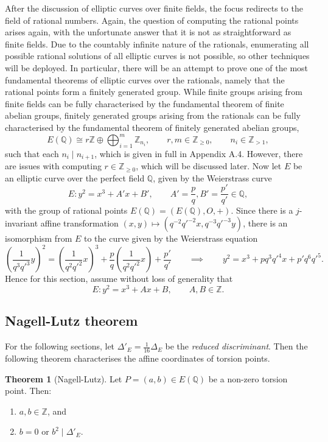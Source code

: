 \documentclass{article}
\newcommand{\Z}{\mathbb{Z}}
\newcommand{\Q}{\mathbb{Q}}
\newcommand{\rb}[1]{\left( #1 \right)}
\theoremstyle{definition}\newtheorem*{definition}{Definition}
\theoremstyle{definition}\newtheorem*{example}{Example}
\theoremstyle{definition}\newtheorem*{remark}{Remark}
\newtheorem{theorem}[proposition]{Theorem}
\begin{document}
After the discussion of elliptic curves over finite fields, the focus redirects to the field of rational numbers. Again, the question of computing the rational points arises again, with the unfortunate answer that it is not as straightforward as finite fields. Due to the countably infinite nature of the rationals, enumerating all possible rational solutions of all elliptic curves is not possible, so other techniques will be deployed. In particular, there will be an attempt to prove one of the most fundamental theorems of elliptic curves over the rationals, namely that the rational points form a finitely generated group. While finite groups arising from finite fields can be fully characterised by the fundamental theorem of finite abelian groups, finitely generated groups arising from the rationals can be fully characterised by the fundamental theorem of finitely generated abelian groups,
$$ E\rb{\Q} \cong r\Z \oplus \bigoplus_{i = 1}^m \Z_{n_i}, \qquad r, m \in \Z_{\ge 0}, \qquad n_i \in \Z_{> 1}, $$
such that each $ n_i \mid n_{i + 1} $, which is given in full in Appendix A.4. However, there are issues with computing $ r \in \Z_{\ge 0} $, which will be discussed later. Now let $ E $ be an elliptic curve over the perfect field $ \Q $, given by the Weierstrass curve
$$ E : y^2 = x^3 + A'x + B', \qquad A' = \dfrac{p}{q}, B' = \dfrac{p'}{q'} \in \Q, $$
with the group of rational points $ E\rb{\Q} = \rb{E\rb{\Q}, O, +} $. Since there is a $ j $-invariant affine transformation $ \rb{x, y} \mapsto \rb{q^{-2}q'^{-2}x, q^{-3}q'^{-3}y} $, there is an isomorphism from $ E $ to the curve given by the Weierstrass equation
$$ \rb{\dfrac{1}{q^3q'^3}y}^2 = \rb{\dfrac{1}{q^2q'^2}x}^3 + \dfrac{p}{q}\rb{\dfrac{1}{q^2q'^2}x} + \dfrac{p'}{q'} \qquad \implies \qquad y^2 = x^3 + pq^3q'^4x + p'q^6q'^5. $$
Hence for this section, assume without loss of generality that
$$ E : y^2 = x^3 + Ax + B, \qquad A, B \in \Z. $$

\subsection{Nagell-Lutz theorem}

For the following sections, let $ \Delta'_E = \tfrac{1}{16}\Delta_E $ be the \emph{reduced discriminant}. Then the following theorem characterises the affine coordinates of torsion points.

\begin{theorem}[Nagell-Lutz]
\label{thm:nagelllutz}
Let $ P = \rb{a, b} \in E\rb{\Q} $ be a non-zero torsion point. Then:
\begin{enumerate}
\item $ a, b \in \Z $, and
\item $ b = 0 $ or $ b^2 \mid \Delta'_E $.
\end{enumerate}
\end{theorem}
\end{document}
